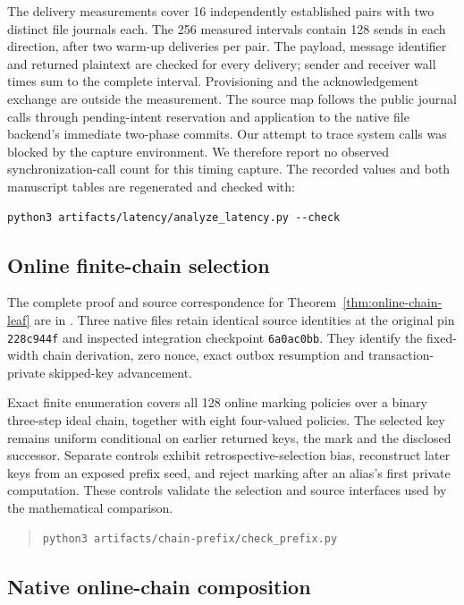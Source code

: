 The delivery measurements cover 16 independently established pairs with two
distinct file journals each. The 256 measured intervals contain 128 sends
in each direction, after two warm-up deliveries per pair. The payload,
message identifier and returned plaintext are checked for every delivery;
sender and receiver wall times sum to the complete interval. Provisioning
and the acknowledgement exchange are outside the measurement. The source
map follows the public journal calls through pending-intent reservation
and application to the native file backend's immediate two-phase commits.
Our attempt to trace system calls was blocked by the capture environment.
We therefore report no observed synchronization-call count for this timing
capture.
The recorded values and both manuscript tables are regenerated and checked
with:
\begin{verbatim}
python3 artifacts/latency/analyze_latency.py --check
\end{verbatim}

\subsection{Online finite-chain selection}
\label{app:chain-prefix}

The complete proof and source correspondence for
Theorem~\ref{thm:online-chain-leaf} are in
. Three native files retain identical
source identities at the original pin \texttt{228c944f} and inspected
integration checkpoint \texttt{6a0ac0bb}. They identify the fixed-width
chain derivation, zero nonce, exact outbox resumption and
transaction-private skipped-key advancement.

Exact finite enumeration covers all 128 online marking policies over
a binary three-step ideal chain, together with eight four-valued
policies. The selected key remains uniform conditional on earlier
returned keys, the mark and the disclosed successor. Separate controls
exhibit retrospective-selection bias, reconstruct later keys from an
exposed prefix seed, and reject marking after an alias's first private
computation. These controls validate the selection and source
interfaces used by the mathematical comparison.
\begin{quote}
\small
\begin{verbatim}
python3 artifacts/chain-prefix/check_prefix.py
\end{verbatim}
\end{quote}

\subsection{Native online-chain composition}
\label{app:native-online-chain}

